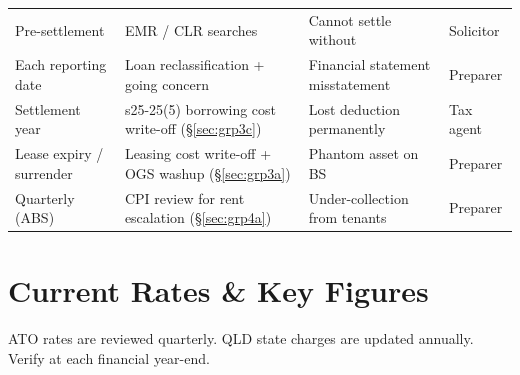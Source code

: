\documentclass[10pt,a4paper]{article}
\begin{document}
{\begin{longtable}{@{} L{2.8cm} L{3.5cm} L{3.0cm} L{2.2cm} @{}}
Pre-settlement & EMR / CLR searches & Cannot settle without & Solicitor \\
Each reporting date & Loan reclassification + going concern & Financial statement misstatement & Preparer \\
Settlement year & s25-25(5) borrowing cost write-off (\S\ref{sec:grp3c}) & Lost deduction permanently & Tax agent \\
Lease expiry / surrender & Leasing cost write-off + OGS washup (\S\ref{sec:grp3a}) & Phantom asset on BS & Preparer \\
Quarterly (ABS) & CPI review for rent escalation (\S\ref{sec:grp4a}) & Under-collection from tenants & Preparer \\
\bottomrule
\end{longtable}}


\section{Current Rates \& Key Figures}
\label{sec:rates}

\begin{note}
ATO rates are reviewed quarterly. QLD state charges are updated annually. Verify at each financial year-end.
\end{note}
\end{document}
